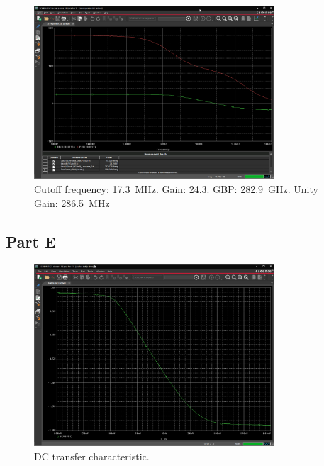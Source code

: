 \documentclass{article}
\newcommand \imgWidthFactor{0.8}
\begin{document}
		\begin{figure}[H]
			\centering
			\includegraphics[width=\imgWidthFactor\textwidth]{d1}
			\caption{Cutoff frequency: \SI{17.3}{\MHz}. Gain: \SI{24.3}{}. GBP: \SI{282.9}{\GHz}. Unity Gain: \SI{286.5}{\MHz}}
		\end{figure}
	
	\subsection{Part E}

		\begin{figure}[H]
			\centering
			\includegraphics[width=\imgWidthFactor\textwidth]{e1}
			\caption{DC transfer characteristic.}
		\end{figure}
\end{document}

